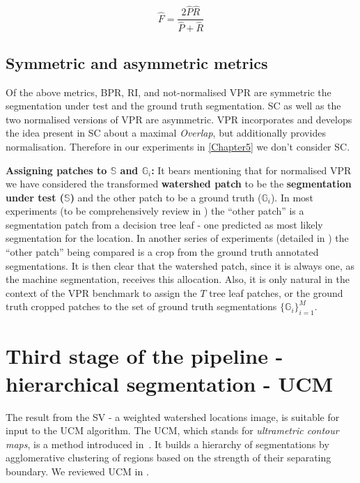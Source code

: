 \[
\hat{{F}}=\frac{2\hat{P}\hat{R}}{\hat{P}+\hat{R}}
\]

\subsection*{Symmetric and asymmetric metrics}
Of the above metrics, BPR, RI, and not-normalised VPR are symmetric \wrt the segmentation under test and the ground truth segmentation. SC as well as the two normalised versions of VPR are asymmetric. VPR incorporates and develops the idea present in SC about a maximal \textit{Overlap}, but additionally provides normalisation. Therefore in our experiments in \cref{Chapter5} we don't consider SC.


\textbf{Assigning patches to $\mathbb{S}$ and $\mathbb{G}_i$:} It bears mentioning %
that for normalised VPR we have considered the transformed \textbf{watershed patch} to be the \textbf{segmentation under test ($\mathbb{S}$)} and the other patch to be a ground truth ($\mathbb{G}_i$). 
In most experiments (to be comprehensively %
review in ) the ``other patch'' is a segmentation patch from a decision tree leaf - one predicted as most likely segmentation for the location. In another series of experiments (detailed in ) the ``other patch'' being compared is a crop from the ground truth annotated segmentations.
It is then clear that the watershed patch, since it is always one, as the machine segmentation, receives this allocation. Also, it is only natural in the context of the VPR benchmark to assign the $T$ tree leaf patches, or the ground truth cropped patches to the set of ground truth segmentations $\{\mathbb{G}_i\}_{i=1}^M$.

\section[Third stage of the pipeline - UCM]{Third stage of the pipeline - hierarchical segmentation - UCM}
The result from the SV - a weighted watershed locations image, is suitable for input to the UCM algorithm. The UCM, which stands for {\it ultrametric contour maps}, is a method introduced in~\cite{Arbelaez2006boundary}. It builds a hierarchy of segmentations by agglomerative clustering of regions based on the strength of their separating boundary. We reviewed UCM in . 

